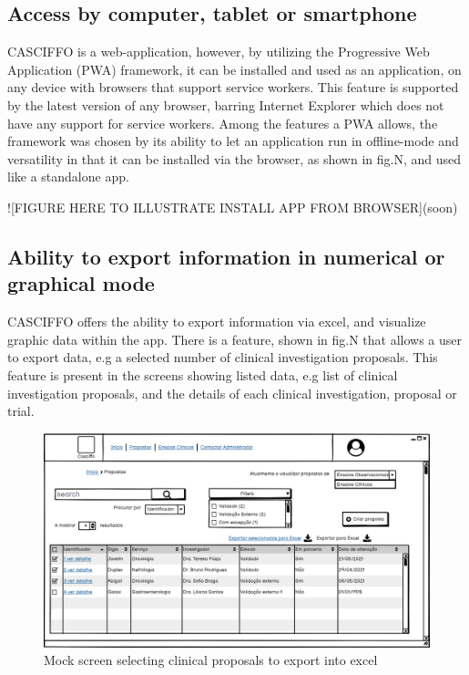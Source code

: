 \subsection{Access by computer, tablet or smartphone}
CASCIFFO is a web-application, however, by utilizing the Progressive Web Application (PWA) framework, it can be installed and used as an application, on any device with browsers that support service workers. This feature is supported by the latest version of any browser, barring Internet Explorer which does not have any support for service workers.  
Among the features a PWA allows, the framework was chosen by its ability to let an application run in offline-mode and versatility in that it can be installed via the browser, as shown in fig.N, and used like a standalone app. 

![FIGURE HERE TO ILLUSTRATE INSTALL APP FROM BROWSER](soon)

\subsection{Ability to export information in numerical or graphical mode}
CASCIFFO offers the ability to export information via excel, and visualize graphic data within the app.  
There is a feature, shown in fig.N that allows a user to export data, e.g a selected number of clinical investigation proposals. This feature is present in the screens showing listed data, e.g list of clinical investigation proposals, and the details of each clinical investigation, proposal or trial.

\begin{figure}
    \centering
    \includegraphics{images/propostas-exportar-para-excel.png}
    \caption{Mock screen selecting clinical proposals to export into excel}
    \label{fig:proposta-export-excel}
\end{figure}

